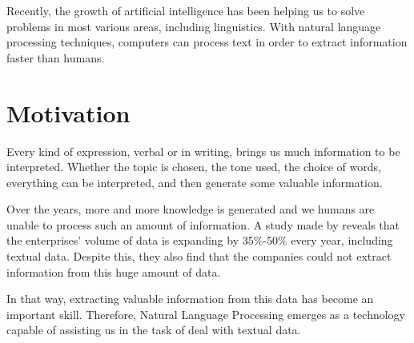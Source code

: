 Recently, the growth of artificial intelligence has been helping us to solve problems in most various areas, including linguistics. With natural language processing techniques, computers can process text in order to extract information faster than humans.

\section{Motivation}




Every kind of expression, verbal or in writing, brings us much information to be interpreted. Whether the topic is chosen, the tone used, the choice of words, everything can be interpreted, and then generate some valuable information.

Over the years, more and more knowledge is generated and we humans are unable to process such an amount of information. A study made by  reveals that the enterprises' volume of data is expanding by 35\%-50\% every year, including textual data. Despite this, they also find that the companies could not extract information from this huge amount of data.

In that way, extracting valuable information from this data has become an important skill. Therefore, Natural Language Processing emerges as a technology capable of assisting us in the task of deal with textual data.

